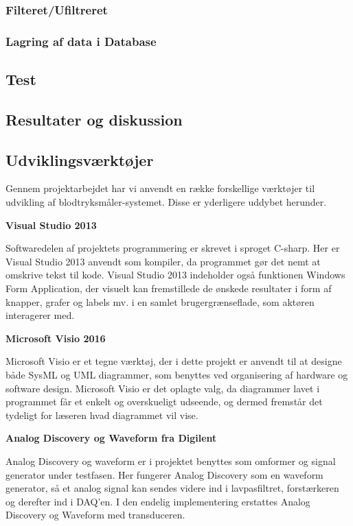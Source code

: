 \subsubsection{Filteret/Ufiltreret}
\subsubsection{Lagring af data i Database}

\subsection{Test}
\subsection{Resultater og diskussion}
\subsection{Udviklingsværktøjer}
Gennem projektarbejdet har vi anvendt en række forskellige værktøjer til udvikling af blodtryksmåler-systemet. Disse er yderligere uddybet herunder.

\textbf{Visual Studio 2013}

Softwaredelen af projektets programmering er skrevet i sproget C-sharp. Her er Visual Studio 2013 anvendt som kompiler, da programmet gør det nemt at omskrive tekst til kode. Visual Studio 2013 indeholder også funktionen Windows Form Application, der visuelt kan fremstillede de ønskede resultater i form af knapper, grafer og labels mv. i en samlet brugergrænseflade, som aktøren interagerer med. 

\textbf{Microsoft Visio 2016}

Microsoft Visio er et tegne værktøj, der i dette projekt er anvendt til at designe både SysML og UML diagrammer, som benyttes ved organisering af hardware og software design. Microsoft Visio er det oplagte valg, da diagrammer lavet i programmet får et enkelt og overskueligt udseende, og dermed fremstår det tydeligt for læseren hvad diagrammet vil vise.

\textbf{Analog Discovery og Waveform fra Digilent}

Analog Discovery og waveform er i projektet benyttes som omformer og signal generator under testfasen. Her fungerer Analog Discovery som en waveform generator, så et analog signal kan sendes videre ind i lavpasfiltret, forstærkeren og derefter ind i DAQ’en. I den endelig implementering erstattes Analog Discovery og Waveform med transduceren. 

